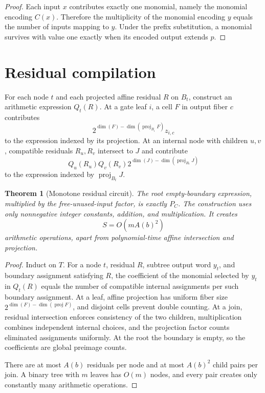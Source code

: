 \documentclass[11pt]{article}
\newtheorem{theorem}{Theorem}
\begin{document}
\begin{proof}
Each input $x$ contributes exactly one monomial, namely the monomial encoding
$C(x)$.  Therefore the multiplicity of the monomial encoding $y$ equals the
number of inputs mapping to $y$.  Under the prefix substitution, a monomial
survives with value one exactly when its encoded output extends $p$.
\end{proof}

\section{Residual compilation}
For each node $t$ and each projected affine residual $R$ on $B_t$, construct an
arithmetic expression $Q_t(R)$.  At a gate leaf $i$, a cell $F$ in output fiber
$c$ contributes
\[
 2^{\dim(F)-\dim(\operatorname{proj}_{B_i}F)}z_{i,c}
\]
to the expression indexed by its projection.  At an internal node with
children $u,v$, compatible residuals $R_u,R_v$ intersect to $J$ and contribute
\[
 Q_u(R_u)Q_v(R_v)
 2^{\dim(J)-\dim(\operatorname{proj}_{B_t}J)}
\]
to the expression indexed by $\operatorname{proj}_{B_t}J$.

\begin{theorem}[Monotone residual circuit]
The root empty-boundary expression, multiplied by the free-unused-input factor,
is exactly $P_C$.  The construction uses only nonnegative integer constants,
addition, and multiplication.  It creates
\[
 S=O(mA(b)^2)
\]
arithmetic operations, apart from polynomial-time affine intersection and
projection.
\end{theorem}

\begin{proof}
Induct on $T$.  For a node $t$, residual $R$, subtree output word $y_t$, and
boundary assignment satisfying $R$, the coefficient of the monomial selected
by $y_t$ in $Q_t(R)$ equals the number of compatible internal assignments per
such boundary assignment.  At a leaf, affine projection has uniform fiber size
$2^{\dim(F)-\dim(\operatorname{proj}F)}$, and disjoint cells prevent double
counting.  At a join, residual intersection enforces consistency of the two
children, multiplication combines independent internal choices, and the
projection factor counts eliminated assignments uniformly.  At the root the
boundary is empty, so the coefficients are global preimage counts.

There are at most $A(b)$ residuals per node and at most $A(b)^2$ child pairs per
join.  A binary tree with $m$ leaves has $O(m)$ nodes, and every pair creates
only constantly many arithmetic operations.
\end{proof}
\end{document}
